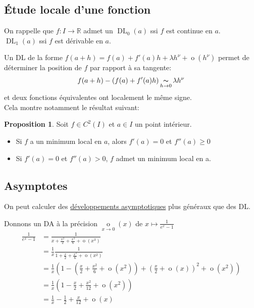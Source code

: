\documentclass[10pt,a4paper]{article}
\theoremstyle{definition}
\newtheorem{proposition}{Proposition}[section]
\DeclareMathOperator*{\eqv}{\thicksim}
\DeclareMathOperator*{\negl}{o}
\DeclareMathOperator{\dl}{DL}
\begin{document}
\subsection{Étude locale d'une fonction}
On rappelle que $f: I \to \mathbb{R}$ admet un $\dl_0(a)$ ssi $f$ est continue en $a$. \\
 $\dl_1(a)$ ssi $f$ est dérivable en $a$. \medskip

Un DL de la forme $f(a + h) = f(a) + f'(a) h + \lambda h^\nu + \negl(h^\nu)$ permet de déterminer la position de $f$ par rapport à sa tangente:
\[f(a + h) - (f(a) + f'(a)h) \eqv\limits_{h \to 0} \lambda h^\nu\]
et deux fonctions équivalentes ont localement le même signe. \\
Cela montre notamment le résultat suivant:
\begin{proposition}
Soit $f \in C^2(I)$ et $a \in I$ un point intérieur.
\begin{itemize}
\item Si $f$ a un minimum local en $a$, alors $f'(a) = 0$ et $f''(a) \geq 0$
\item Si $f'(a) = 0$ et $f''(a) > 0$, $f$ admet un minimum local en a.
\end{itemize}
\end{proposition}

\pagebreak

\subsection{Asymptotes}
On peut calculer des \uline{développements asymptotiques} plus généraux que des DL. \medskip

Donnons un DA à la précision $\negl\limits_{x \to 0}(x)$ de $x \mapsto \frac{1}{e^x - 1}$
\begin{align*}
\frac{1}{e^x - 1} &= \frac{1}{x + \frac{x^2}{2} + \frac{x^3}{6} + \negl(x^3)} \\
&= \frac{1}{x} \frac{1}{1 + \frac{x}{2} + \frac{x^2}{6} + \negl(x^2)} \\
&= \frac{1}{x} \left(1 - \left( \frac{x}{2} + \frac{x^2}{6} + \negl(x^2) \right) + \left( \frac{x}{2} + \negl(x) \right)^2 + \negl(x^2) \right) \\
&= \frac{1}{x} \left(1 - \frac{x}{2} + \frac{x^2}{12} + \negl(x^2) \right) \\
&= \frac{1}{x} - \frac{1}{2} + \frac{x}{12} + \negl(x)
\end{align*} \medskip
\end{document}
